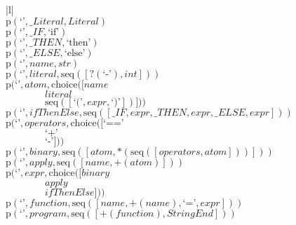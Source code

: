 \footnotesize\begin{center}\begin{tabular}{|l|}\hline
{}
\\\hline
$\mathrm{p}(\text{`'},\mathit{\_ Literal},\mathit{Literal})$	\\
$\mathrm{p}(\text{`'},\mathit{\_ IF},\text{`if'})$	\\
$\mathrm{p}(\text{`'},\mathit{\_ THEN},\text{`then'})$	\\
$\mathrm{p}(\text{`'},\mathit{\_ ELSE},\text{`else'})$	\\
$\mathrm{p}(\text{`'},\mathit{name},str)$	\\
$\mathrm{p}(\text{`'},\mathit{literal},\mathrm{seq}\left(\left[{?}\left(\text{`-'}\right), int\right]\right))$	\\
$\mathrm{p}(\text{`'},\mathit{atom},\mathrm{choice}([\mathit{name}$\\$\qquad\qquad\mathit{literal}$\\$\qquad\qquad\mathrm{seq}\left(\left[\text{`('}, \mathit{expr}, \text{`)'}\right]\right)]))$	\\
$\mathrm{p}(\text{`'},\mathit{ifThenElse},\mathrm{seq}\left(\left[\mathit{\_ IF}, \mathit{expr}, \mathit{\_ THEN}, \mathit{expr}, \mathit{\_ ELSE}, \mathit{expr}\right]\right))$	\\
$\mathrm{p}(\text{`'},\mathit{operators},\mathrm{choice}([\text{`=='}$\\$\qquad\qquad\text{`+'}$\\$\qquad\qquad\text{`-'}]))$	\\
$\mathrm{p}(\text{`'},\mathit{binary},\mathrm{seq}\left(\left[\mathit{atom}, {*}\left(\mathrm{seq}\left(\left[\mathit{operators}, \mathit{atom}\right]\right)\right)\right]\right))$	\\
$\mathrm{p}(\text{`'},\mathit{apply},\mathrm{seq}\left(\left[\mathit{name}, {+}\left(\mathit{atom}\right)\right]\right))$	\\
$\mathrm{p}(\text{`'},\mathit{expr},\mathrm{choice}([\mathit{binary}$\\$\qquad\qquad\mathit{apply}$\\$\qquad\qquad\mathit{ifThenElse}]))$	\\
$\mathrm{p}(\text{`'},\mathit{function},\mathrm{seq}\left(\left[\mathit{name}, {+}\left(\mathit{name}\right), \text{`='}, \mathit{expr}\right]\right))$	\\
$\mathrm{p}(\text{`'},\mathit{program},\mathrm{seq}\left(\left[{+}\left(\mathit{function}\right), \mathit{StringEnd}\right]\right))$	\\
\hline\end{tabular}\end{center}

